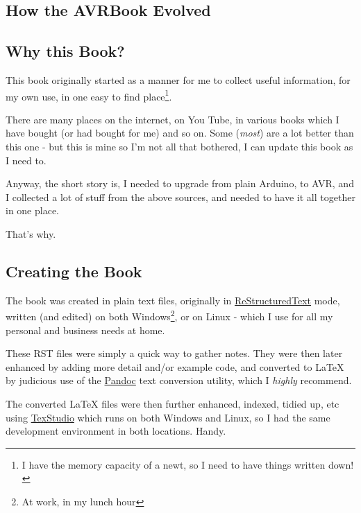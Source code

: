 \begin{appendix}

\chapter{How the AVRBook Evolved}
\label{appendix-a-how-it-was-done}%

\section*{Why this Book?}\label{why-this-book}

This book originally started as a manner for me to collect useful information, for my own use, in one easy to find place\footnote{I have the memory capacity of a newt, so I need to have things written down!}.

There are many places on the internet, on You Tube, in various books which I have bought (or had bought for me) and so on. Some (\emph{most}) are a lot better than this one - but this is mine so I'm not all that bothered, I can update this book as I need to.

Anyway, the short story is, I needed to upgrade from plain Arduino, to AVR, and I collected a lot of stuff from the above sources, and needed to have it all together in one place.

That's why.

\section*{Creating the Book}\label{creating-the-book}

The book was created in plain text files, originally in \href{https://en.wikipedia.org/wiki/ReStructuredText}{ReStructuredText} mode, written (and edited) on both Windows\footnote{At work, in my lunch hour}, or on Linux - which I use for all my personal and business needs at home.

These RST files were simply a quick way to gather notes. They were then later enhanced by adding more detail and/or example code, and converted to \LaTeX{} by judicious use of the \href{https://pandoc.org/}{Pandoc} text conversion utility, which I \emph{highly} recommend.

The converted \LaTeX{} files were then further enhanced, indexed, tidied up, etc using \href{http://www.texstudio.org/}{TexStudio} which runs on both Windows and Linux, so I had the same development environment in both locations. Handy. 


\end{appendix}
